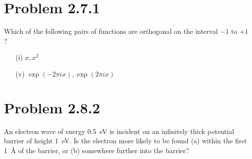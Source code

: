 \pagebreak

\section*{Problem 2.7.1}

Which of the following pairs of functions are orthogonal on the
interval $-1$ to $+1$?

\begin{enumerate}
  \item[(i)] $x, x^2$


  \item[(v)] $\exp(-2\pi ix), \exp(2\pi ix)$


\end{enumerate}

\pagebreak

\section*{Problem 2.8.2}

An electron wave of energy \SI{0.5}{\electronvolt} is incident on an
infinitely thick potential barrier of height
\SI{1}{\electronvolt}. Is the electron more likely to be found (a) within the
first \SI{1}{\angstrom} of the barrier, or (b)
somewhere further into the barrier?



